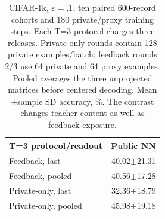 \begin{table}[t]
\caption{CIFAR-1k, $\varepsilon=.1$, ten paired 600-record cohorts and 180 private/proxy training steps. Each T=3 protocol charges three releases. Private-only rounds contain 128 private examples/batch; feedback rounds 2/3 use 64 private and 64 proxy examples. Pooled averages the three unprojected matrices before centered decoding. Mean$\pm$sample SD accuracy, \%. The contrast changes teacher content as well as feedback exposure.}
\label{tab:no-feedback}\small
\centering
\begin{tabular}{@{}lr@{}}\toprule
T=3 protocol/readout & Public NN \\
\midrule
Feedback, last & 40.02$\pm$21.31 \\
Feedback, pooled & 40.56$\pm$17.28 \\
Private-only, last & 32.36$\pm$18.79 \\
Private-only, pooled & 45.98$\pm$19.18 \\
\bottomrule\end{tabular}
\end{table}
